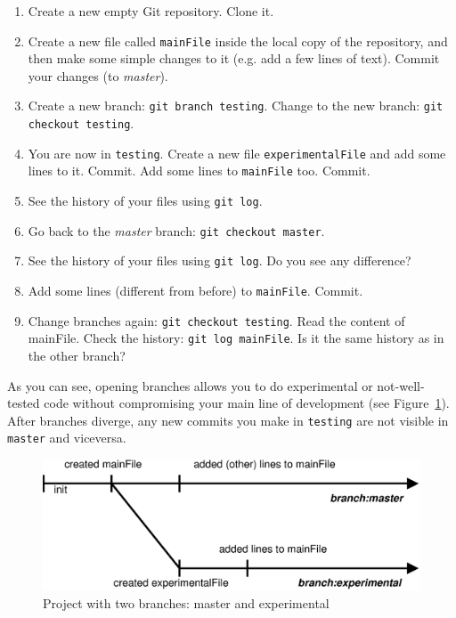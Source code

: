 \begin{enumerate}
\item Create a new empty Git repository. Clone it.
\item Create a new file called \verb+mainFile+ inside 
  the local copy of the repository, and then make some
  simple changes to it (e.g. add a few lines of text). 
  Commit your changes (to \emph{master}). 
\item Create a new branch: \verb+git branch testing+. Change to the
  new branch: \verb+git checkout testing+.
\item You are now in \verb+testing+. Create a new file
  \verb+experimentalFile+ and add some lines to it. Commit. 
  Add some lines
  to \verb+mainFile+ too. Commit.
\item See the history of your files using \verb+git log+.
\item Go back to the \emph{master} branch: 
  \verb+git checkout master+. 
\item See the history of your files using \verb+git log+. Do you see
  any difference?
\item Add some lines (different from before) to
  \verb+mainFile+. Commit.
\item Change branches again: \verb+git checkout testing+. Read the
  content of mainFile. Check the history: \verb+git log mainFile+. Is
  it the same history as in the other branch?
\end{enumerate}

As you can see, opening branches allows you to do experimental or
not-well-tested code without compromising your main line of
development (see Figure~\ref{fig:git-example-3}). 
After branches diverge, any new commits you make in \verb+testing+ are not
visible in \verb+master+ and viceversa. 

\begin{figure}[htbp!]
  \centering
  \includegraphics[width=\textwidth]{gfx/commit_history_3.eps}
  \caption{Project with two branches: master and experimental}
  \label{fig:git-example-3}
\end{figure}

